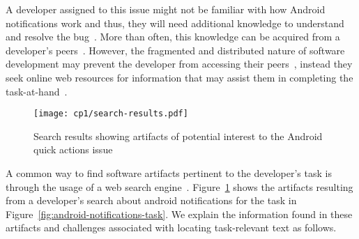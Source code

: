  
 \medskip
 A developer assigned to this issue might not be familiar with how Android notifications work and thus, they will need additional knowledge to understand and resolve the bug~\cite{ko2007, Li2013, sillito2006}. 
 More than often, this knowledge can be acquired from a developer's peers~\cite{singer2011}. 
 However, the fragmented and distributed nature of software development  
 may prevent the developer from accessing their peers~\cite{ko2007},
 instead they seek online web resources for information 
 that may assist them in completing the task-at-hand~\cite{Xia2017, rao2020}.
 
 
 
 
 
 \begin{figure}
     \centering
     \texttt{[image: cp1/search-results.pdf]}
     \caption{Search results showing artifacts of potential interest to the Android quick actions issue}
     \label{fig:android-search-results}
 \end{figure}
 
 
 
A common way to find software artifacts
pertinent to the developer's task
is through the usage of a web search engine~\cite{Brandt2009a, Li2013}.
Figure~\ref{fig:android-search-results}
shows the artifacts resulting from a developer's search 
about android notifications for the task in Figure~\ref{fig:android-notifications-task}.
We explain the information found in these artifacts
and challenges associated with locating 
task-relevant text  as follows.






